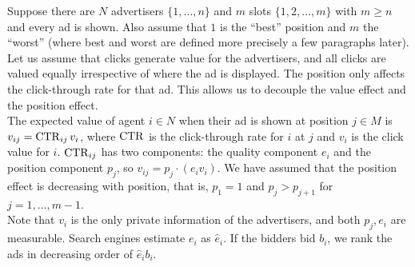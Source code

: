 		\begin{fex}
			Suppose there are $N$ advertisers $\{1,\ldots,n\}$ and $m$ slots $\{1,2,\ldots,m\}$ with $m \ge n$ and every ad is shown. Also assume that $1$ is the ``best'' position and $m$ the ``worst'' (where best and worst are defined more precisely a few paragraphs later).\\

			Let us assume that clicks generate value for the advertisers, and all clicks are valued equally irrespective of where the ad is displayed. The position only affects the click-through rate for that ad. This allows us to decouple the value effect and the position effect.\\
			The expected value of agent $i \in N$ when their ad is shown at position $j \in M$ is $v_{ij} = \operatorname{CTR}_{ij} v_i$, where $\operatorname{CTR}$ is the click-through rate for $i$ at $j$ and $v_i$ is the click value for $i$. $\operatorname{CTR}_{ij}$ has two components: the quality component $e_i$ and the position component $p_j$, so $v_{ij} = p_j \cdot (e_i v_i)$. We have assumed that the position effect is decreasing with position, that is, $p_1 = 1$ and $p_j > p_{j+1}$ for $j = 1,\ldots,m-1$.\\
			Note that $v_i$ is the only private information of the advertisers, and both $p_j,e_i$ are measurable. Search engines estimate $e_i$ as $\hat{e}_i$. If the bidders bid $b_i$, we rank the ads in decreasing order of $\hat{e}_i b_i$.\\


\end{fex}
